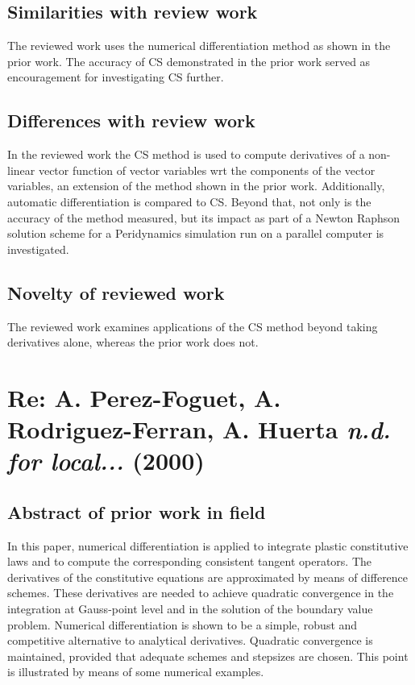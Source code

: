 \documentclass[10pt,letterpaper,draft]{article}
\begin{document}
\subsection{Similarities with review work}

The reviewed work uses the numerical differentiation method as shown in the
prior work. The accuracy of CS demonstrated in the prior work served as encouragement
for investigating CS further.

\subsection{Differences with review work}

In the reviewed work the CS method is used to compute derivatives of a
non-linear vector function of vector variables wrt the components of the vector
variables, an extension of the method shown in the prior work.
Additionally, automatic differentiation is compared to CS. Beyond that, not
only is the accuracy of the method measured, but its impact as part of a Newton
Raphson solution scheme for a Peridynamics simulation run on a parallel
computer is investigated.

\subsection{Novelty of reviewed work}
The reviewed work examines applications of the CS method beyond taking derivatives alone,
whereas the prior work does not. 

\section{Re: A. Perez-Foguet, A. Rodriguez-Ferran, A. Huerta \emph{n.d. for local...} (2000)}
\subsection{Abstract of prior work in field}

In this paper, numerical differentiation is applied to integrate plastic
constitutive laws and to compute the corresponding consistent tangent
operators. The derivatives of the constitutive equations are approximated by
means of difference schemes. These derivatives are needed to achieve quadratic
convergence in the integration at Gauss-point level and in the solution of the
boundary value problem.  Numerical differentiation is shown to be a simple,
robust and competitive alternative to analytical derivatives. Quadratic
convergence is maintained, provided that adequate schemes and stepsizes are
chosen. This point is illustrated by means of some numerical examples.
\end{document}
